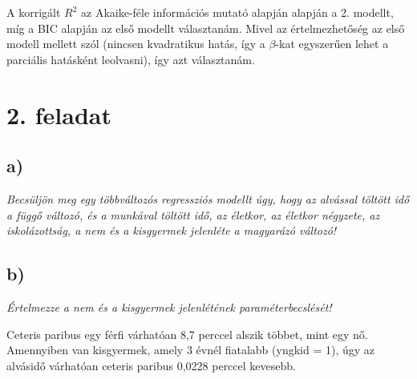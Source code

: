 \documentclass[
]{article}
\newenvironment{Shaded}{\begin{snugshade}}{\end{snugshade}}
\newcommand{\CommentTok}[1]{\textcolor[rgb]{0.56,0.35,0.01}{\textit{#1}}}
\newcommand{\DataTypeTok}[1]{\textcolor[rgb]{0.13,0.29,0.53}{#1}}
\newcommand{\DecValTok}[1]{\textcolor[rgb]{0.00,0.00,0.81}{#1}}
\newcommand{\KeywordTok}[1]{\textcolor[rgb]{0.13,0.29,0.53}{\textbf{#1}}}
\newcommand{\NormalTok}[1]{#1}
\newcommand{\OperatorTok}[1]{\textcolor[rgb]{0.81,0.36,0.00}{\textbf{#1}}}
\newcommand{\StringTok}[1]{\textcolor[rgb]{0.31,0.60,0.02}{#1}}
\begin{document}
A korrigált \(R^2\) az Akaike-féle információs mutató alapján alapján a
2. modellt, míg a BIC alapján az első modellt választanám. Mivel az
értelmezhetőség az első modell mellett szól (nincsen kvadratikus hatás,
így a \(\beta\)-kat egyszerűen lehet a parciális hatásként leolvasni),
így azt választanám.

\hypertarget{feladat-1}{%
\section{2. feladat}\label{feladat-1}}

\hypertarget{a-1}{%
\subsection{a)}\label{a-1}}

\emph{Becsüljön meg egy többváltozós regressziós modellt úgy, hogy az
alvással töltött idő a függő változó, és a munkával töltött idő, az
életkor, az életkor négyzete, az iskolázottság, a nem és a kisgyermek
jelenléte a magyarázó változó!}

\begin{Shaded}
\end{Shaded}

\hypertarget{b-1}{%
\subsection{b)}\label{b-1}}

\emph{Értelmezze a nem és a kisgyermek jelenlétének paraméterbecslését!}

Ceteris paribus egy férfi várhatóan 8,7 perccel alszik többet, mint egy
nő. Amennyiben van kisgyermek, amely 3 évnél fiatalabb (yngkid = 1), úgy
az alvásidő várhatóan ceteris paribus 0,0228 perccel kevesebb.
\end{document}
